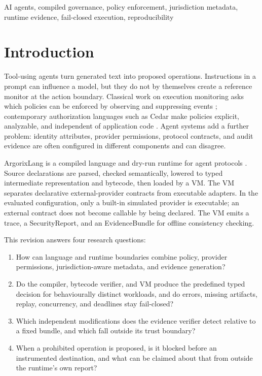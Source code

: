 \documentclass[conference]{IEEEtran}
\begin{document}
\begin{IEEEkeywords}
AI agents, compiled governance, policy enforcement, jurisdiction metadata,
runtime evidence, fail-closed execution, reproducibility
\end{IEEEkeywords}

\section{Introduction}

Tool-using agents turn generated text into proposed operations.  Instructions
in a prompt can influence a model, but they do not by themselves create a
reference monitor at the action boundary.  Classical work on execution
monitoring asks which policies can be enforced by observing and suppressing
events \cite{schneider2000,ligatti2010}; contemporary authorization languages
such as Cedar make policies explicit, analyzable, and independent of
application code \cite{cutler2024cedar}.  Agent systems add a further problem:
identity attributes, provider permissions, protocol contracts, and audit
evidence are often configured in different components and can disagree.

ArgorixLang is a compiled language and dry-run runtime for agent protocols
\cite{argorixlang2026}.  Source declarations are parsed, checked semantically,
lowered to typed intermediate representation and bytecode, then loaded by a VM.
The VM separates declarative external-provider contracts from executable
adapters.  In the evaluated configuration, only a built-in simulated provider
is executable; an external contract does not become callable by being declared.
The VM emits a trace, a SecurityReport, and an EvidenceBundle for offline
consistency checking.

This revision answers four research questions:

\begin{enumerate}
\item How can language and runtime boundaries combine policy, provider
permissions, jurisdiction-aware metadata, and evidence generation?
\item Do the compiler, bytecode verifier, and VM produce the predefined typed
decision for behaviourally distinct workloads, and do errors, missing
artifacts, replay, concurrency, and deadlines stay fail-closed?
\item Which independent modifications does the evidence verifier detect
relative to a fixed bundle, and which fall outside its trust boundary?
\item When a prohibited operation is proposed, is it blocked before an
instrumented destination, and what can be claimed about that from outside the
runtime's own report?
\end{enumerate}
\end{document}
